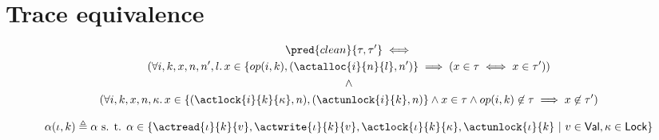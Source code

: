 \iffalse
\section{Trace equivalence}

\begin{gather*}
	\pred{clean}{\tau, \tau'} \iff \\
	(\forall i, k, x, n, n', l \ldotp x \in \{op(i, k), (\actalloc{i}{n}{l}, n')\} \implies (x \in \tau \iff x \in \tau')) \\
	\land \\
	(\forall i, k, x, n, \kappa \ldotp x \in \{ (\actlock{i}{k}{\kappa}, n), (\actunlock{i}{k}, n) \} \land x \in \tau \land op(i, k) \not\in \tau \implies x \not\in \tau')
\end{gather*}

\[
	\alpha(\iota, k) \triangleq \alpha \text{ s. t. }
	\alpha \in 
		\{
			\actread{\iota}{k}{v},
			\actwrite{\iota}{k}{v},
			\actlock{\iota}{k}{\kappa},
			\actunlock{\iota}{k}\
			|\ v \in \mathsf{Val}, \kappa \in \mathsf{Lock}
		\}
\]

